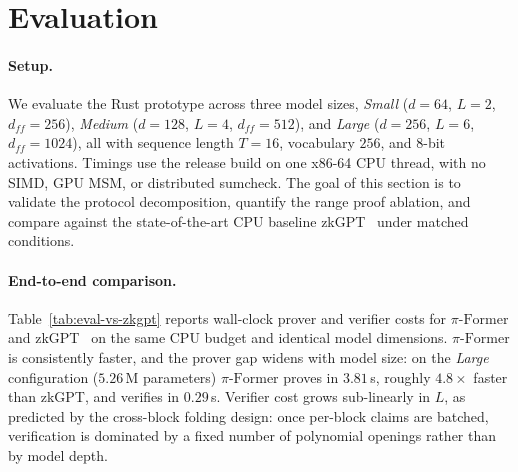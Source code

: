 \documentclass[letterpaper,twocolumn,10pt]{article}
\theoremstyle{remark}
\theoremstyle{definition}
\newcommand{\sys}{\ensuremath{\pi\text{-Former}}}
\begin{document}
\section{Evaluation}
\label{sec:eval}

\paragraph{Setup.}
We evaluate the Rust prototype across three model sizes,
\emph{Small} ($d\!=\!64$, $L\!=\!2$, $d_{ff}\!=\!256$),
\emph{Medium} ($d\!=\!128$, $L\!=\!4$, $d_{ff}\!=\!512$), and
\emph{Large} ($d\!=\!256$, $L\!=\!6$, $d_{ff}\!=\!1024$),
all with sequence length $T\!=\!16$, vocabulary $256$, and 8-bit
activations. Timings use the release build on one x86-64 CPU thread,
with no SIMD, GPU MSM, or distributed sumcheck. The goal of this
section is to validate the protocol decomposition, quantify the range
proof ablation, and compare against the state-of-the-art CPU
baseline zkGPT~\cite{qu2025zkgpt} under matched conditions.

\paragraph{End-to-end comparison.}
Table~\ref{tab:eval-vs-zkgpt} reports wall-clock prover and verifier
costs for \sys{} and zkGPT~\cite{qu2025zkgpt} on the same CPU budget
and identical model dimensions. \sys{} is consistently faster, and the
prover gap widens with model size: on the \emph{Large} configuration
($5.26$\,M parameters) \sys{} proves in $3.81$\,s, roughly
$4.8\times$ faster than zkGPT, and verifies in $0.29$\,s. Verifier
cost grows sub-linearly in $L$, as predicted by the cross-block
folding design: once per-block claims are batched, verification is
dominated by a fixed number of polynomial openings rather than by
model depth.
\end{document}
